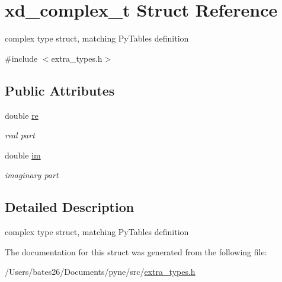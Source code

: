 \hypertarget{structxd__complex__t}{\section{xd\+\_\+complex\+\_\+t Struct Reference}
\label{structxd__complex__t}
}


complex type struct, matching Py\+Tables definition  




{\ttfamily \#include $<$extra\+\_\+types.\+h$>$}

\subsection*{Public Attributes}
\begin{DoxyCompactItemize}
\item 
\hypertarget{structxd__complex__t_afbbb6ed1fe3b729258421cb3eaa8c4d8}{double \hyperlink{structxd__complex__t_afbbb6ed1fe3b729258421cb3eaa8c4d8}{re}}\label{structxd__complex__t_afbbb6ed1fe3b729258421cb3eaa8c4d8}

\begin{DoxyCompactList}\small\item\em real part \end{DoxyCompactList}\item 
\hypertarget{structxd__complex__t_afb1d09ccfa0e10044572c8a7bf4806f2}{double \hyperlink{structxd__complex__t_afb1d09ccfa0e10044572c8a7bf4806f2}{im}}\label{structxd__complex__t_afb1d09ccfa0e10044572c8a7bf4806f2}

\begin{DoxyCompactList}\small\item\em imaginary part \end{DoxyCompactList}\end{DoxyCompactItemize}


\subsection{Detailed Description}
complex type struct, matching Py\+Tables definition 

The documentation for this struct was generated from the following file\+:\begin{DoxyCompactItemize}
\item 
/\+Users/bates26/\+Documents/pyne/src/\hyperlink{extra__types_8h}{extra\+\_\+types.\+h}\end{DoxyCompactItemize}

